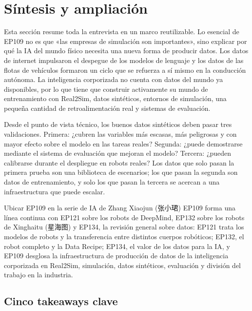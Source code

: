 \section{Síntesis y ampliación}

Esta sección resume toda la entrevista en un marco reutilizable. Lo esencial de EP109 no es que «las empresas de simulación son importantes», sino explicar por qué la IA del mundo físico necesita una nueva forma de producir datos. Los datos de internet impulsaron el despegue de los modelos de lenguaje y los datos de las flotas de vehículos formaron un ciclo que se refuerza a sí mismo en la conducción autónoma. La inteligencia corporizada no cuenta con datos del mundo ya disponibles, por lo que tiene que construir activamente su mundo de entrenamiento con Real2Sim, datos sintéticos, entornos de simulación, una pequeña cantidad de retroalimentación real y sistemas de evaluación.

Desde el punto de vista técnico, los buenos datos sintéticos deben pasar tres validaciones. Primera: ¿cubren las variables más escasas, más peligrosas y con mayor efecto sobre el modelo en las tareas reales? Segunda: ¿puede demostrarse mediante el sistema de evaluación que mejoran el modelo? Tercera: ¿pueden calibrarse durante el despliegue en robots reales? Los datos que solo pasan la primera prueba son una biblioteca de escenarios; los que pasan la segunda son datos de entrenamiento, y solo los que pasan la tercera se acercan a una infraestructura que puede escalar.

\begin{importantbox}{Ubicar EP109 en la serie de IA de Zhang Xiaojun (张小珺)}
EP109 forma una línea continua con EP121 sobre los robots de DeepMind, EP132 sobre los robots de Xinghaitu (星海图) y EP134, la revisión general sobre datos: EP121 trata los modelos de robots y la transferencia entre distintos cuerpos robóticos; EP132, el robot completo y la Data Recipe; EP134, el valor de los datos para la IA, y EP109 desglosa la infraestructura de producción de datos de la inteligencia corporizada en Real2Sim, simulación, datos sintéticos, evaluación y división del trabajo en la industria.
\end{importantbox}

\subsection{Cinco takeaways clave}

